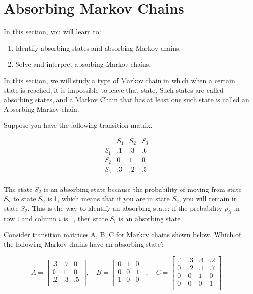 \section{Absorbing Markov Chains}

In this section, you will learn to:
\begin{enumerate}
    \item Identify absorbing states and absorbing Markov chains.
    \item Solve and interpret absorbing Markov chains.
\end{enumerate}

In this section, we will study a type of Markov chain in which when a certain state is reached, it is impossible to leave that state. Such states are called absorbing states, and a Markov Chain that has at least one such state is called an Absorbing Markov chain.

Suppose you have the following transition matrix.

\[
    \begin{array}{c|ccc}
            & S_1 & S_2 & S_3 \\
        \hline
        S_1 & .1  & .3  & .6  \\
        S_2 & 0   & 1   & 0   \\
        S_3 & .3  & .2  & .5  \\
    \end{array}
\]

The state $S_2$ is an absorbing state because the probability of moving from state $S_2$ to state $S_2$ is 1, which means that if you are in state $S_2$, you will remain in state $S_2$. This is the way to identify an absorbing state: if the probability $p_{ii}$ in row $i$ and column $i$ is 1, then state $S_i$ is an absorbing state.

\begin{example}
    Consider transition matrices A, B, C for Markov chains shown below. Which of the following Markov chains have an absorbing state?

    \[
        A = \begin{bmatrix}
            .3 & .7 & 0  \\
            0  & 1  & 0  \\
            .2 & .3 & .5 \\
        \end{bmatrix}, \quad
        B = \begin{bmatrix}
            0 & 1 & 0 \\
            0 & 0 & 1 \\
            1 & 0 & 0 \\
        \end{bmatrix}, \quad
        C = \begin{bmatrix}
            .1 & .3 & .4 & .2 \\
            0  & .2 & .1 & .7 \\
            0  & 0  & 1  & 0  \\
            0  & 0  & 0  & 1  \\
        \end{bmatrix}
    \]
\end{example}

